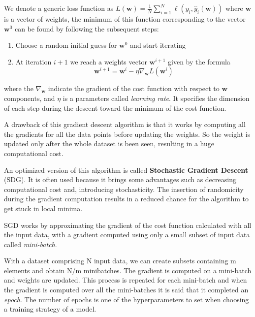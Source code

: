 \documentclass[11pt]{report}
\begin{document}
We denote a generic loss function as $L(\mathbf{w}) = \frac{1}{N}\sum_{i = 1}^N \ell(y_i, \hat y_i(\mathbf{w}))$ where $\mathbf{w}$ is a vector of weights, the minimum of this function corresponding to the vector $\mathbf{w}^0$ can be found by following the subsequent steps:

\begin{enumerate}
\item Choose a random initial guess for $\mathbf{w}^{0}$ and start iterating
\item At iteration $i+1$ we reach a weights vector $\mathbf{w}^{i+1}$ given by the formula
\begin{equation}\label{eq:weights_update}
\mathbf{w}^{i+1} = \mathbf{w}^{i} - \eta \nabla_\mathbf{w} L(\mathbf{w}^i)
\end{equation}
\end{enumerate}

 where the $\nabla_\mathbf{w}$ indicate the gradient of the cost function with respect to $\mathbf{w}$ components, and $\eta$ is a parameters called \emph{learning rate}.
 It specifies the dimension of each step during the descent toward the minimum of the cost function.


A drawback of this gradient descent algorithm is that it works by computing all the gradients for all the data points before updating the weights.
So the weight is updated only after the whole dataset is been seen, resulting in a huge computational cost.

An optimized version of this algorithm is called \textbf{Stochastic Gradient Descent} (SDG).
It is often used because it brings some advantages such as decreasing computational cost and, introducing stochasticity.
The insertion of randomicity during the gradient computation results in a reduced chance for the algorithm to get stuck in local minima.

SGD works by approximating the gradient of the cost function calculated with all the input data, with a gradient computed using only a small subset of input data called \emph{mini-batch}.

With a dataset comprising N input data, we can create subsets containing m elements and obtain N/m minibatches.
The gradient is computed on a mini-batch and weights are updated.
This process is repeated for each mini-batch and when the gradient is computed over all the mini-batches it is said that it completed an \emph{epoch}.
The number of epochs is one of the hyperparameters to set when choosing a training strategy of a model.
\end{document}
